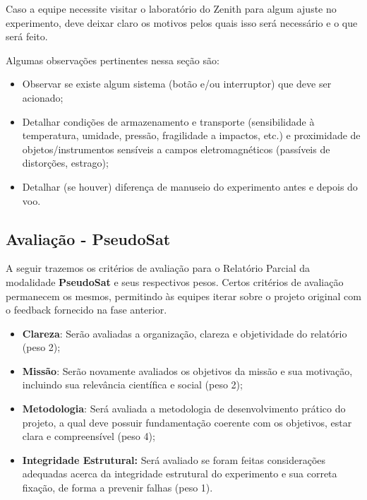             Caso a equipe necessite visitar o laboratório do Zenith para algum ajuste no experimento, deve deixar claro os motivos pelos quais isso será necessário e o que será feito.
            
            Algumas observações pertinentes nessa seção são:
            \begin{itemize}
                \item Observar se existe algum sistema (botão e/ou interruptor) que deve ser acionado; 
                \item Detalhar condições de armazenamento e transporte (sensibilidade à temperatura, umidade, pressão, fragilidade a impactos, etc.) e proximidade de objetos/instrumentos sensíveis a campos eletromagnéticos (passíveis de distorções, estrago);
                \item Detalhar (se houver) diferença de manuseio do experimento antes e depois do voo.
            \end{itemize}

    \subsection{Avaliação - PseudoSat}
        A seguir trazemos os critérios de avaliação para o Relatório Parcial da modalidade \textbf{PseudoSat} e seus respectivos pesos. Certos critérios de avaliação permanecem os mesmos, permitindo às equipes iterar sobre o projeto original com o feedback fornecido na fase anterior.
        
        \begin{itemize}
            \item \textbf{Clareza}: Serão avaliadas a organização, clareza e objetividade do relatório (peso 2);
                     
            \item \textbf{Missão}: Serão novamente avaliados os objetivos da missão e sua motivação, incluindo sua relevância científica e social (peso 2);
            
            \item \textbf{Metodologia}: Será avaliada a metodologia de desenvolvimento prático do projeto, a qual deve possuir fundamentação coerente com os objetivos, estar clara e compreensível (peso 4);

            \item \textbf{Integridade Estrutural:} Será avaliado se foram feitas considerações adequadas acerca da integridade estrutural do experimento e sua correta fixação, de forma a prevenir falhas (peso 1).
        \end{itemize}
        
